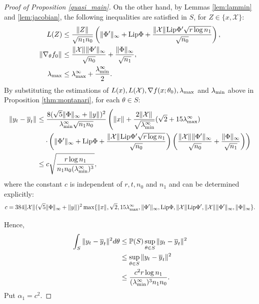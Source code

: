 \documentclass{article}
\theoremstyle{definition}
\theoremstyle{remark}
\numberwithin{equation}{section}
\newcommand{\X}{\mathcal{X}}
\newcommand{\lammax}{\lambda_{\textup{max}}}
\newcommand{\lammin}{\lambda_{\textup{min}}}
\newcommand{\norm}[2]{
    \|#1\|_{#2}
}
\begin{document}
\begin{proof}[Proof of Proposition \ref{quasi_main}]
    On the other hand, by Lemmas \ref{lem:lammin} and \ref{lem:jacobian}, the following inequalities are satisfied in $S$, for $Z \in \{x,\X\}$:
    \begin{align}
        L(Z) &\le \frac{\norm{Z}{}}{\sqrt{n_1n_0}}\left(\norm{\Phi'}{\infty} + \textup{Lip}\Phi + \frac{\norm{\X}{}\textup{Lip}\Phi'\sqrt{r \log n_1}}{\sqrt{n_0}}\right),\\
        \norm{\nabla_\theta f_0}{} &\le \frac{\norm{\X}{}\norm{\Phi'}{\infty}}{\sqrt{n_0}} + \frac{\norm{\Phi}{\infty}}{\sqrt{n_1}},\\
        \lammax &\le \lammax^\infty + \frac{\lammin^\infty}{2}.
    \end{align}
    By substituting the estimations of $L(x),L(\X),\nabla f(x;\theta_0), \lammax$ and $\lammin$ above in Proposition \ref{thm:montanari}, for each $\theta \in S$:
    \begin{align}
        \norm{y_t - \overline y_t}{}&\le\frac{8(\sqrt{5}\norm{\Phi}{\infty} + \norm{y}{})^2}{\lammin^\infty \sqrt{n_1n_0}}\left(\norm{x}{} + \frac{2 \norm{\X}{}}{\sqrt{\lammin^\infty}}(\sqrt 2 + 15 \lammax^\infty) \right. \\
        &\left.\quad \cdot\left(\norm{\Phi'}{\infty} + \textup{Lip}\Phi + \frac{\norm{\X}{}\textup{Lip}\Phi'\sqrt{r \log n_1}}{\sqrt{n_0}}\right)\left(\frac{\norm{\X}{}\norm{\Phi'}{\infty}}{\sqrt{n_0}} + \frac{\norm{\Phi}{\infty}}{\sqrt{n_1}}\right)\right) \\
        &\le c \sqrt{\frac{r\log n_1}{n_1n_0(\lammin^\infty)^3}},
    \end{align}
    where the constant $c$ is independent of $r,t,n_0$ and $n_1$ and can be determined explicitly:
    \[c = 384\norm{\X}{}(\sqrt{5}\norm{\Phi}{\infty} + \norm{y}{})^2\max\{\norm{x}{},\sqrt 2, 15\lammax^\infty,\norm{\Phi'}{\infty}, \textup{Lip}\Phi, \norm{\X}{}\textup{Lip}\Phi',\norm{\X}{}\norm{\Phi'}{\infty},\norm{\Phi}{\infty}\}.
    \]

    Hence,
    \begin{align}
        \int_S \norm{y_t-\overline y_t}{}^2 d\theta &\le \mathbb P(S)\sup_{\theta\in S} \norm{y_t-\overline y_t}{}^2 \\
        &\le \sup_{\theta\in S} \norm{y_t-\overline y_t}{}^2 \\
        &\le \frac{c^2r\log n_1}{(\lammin^\infty)^3n_1n_0}.
    \end{align}
    Put $\alpha_1 = c^2$.


\end{proof}
\end{document}
